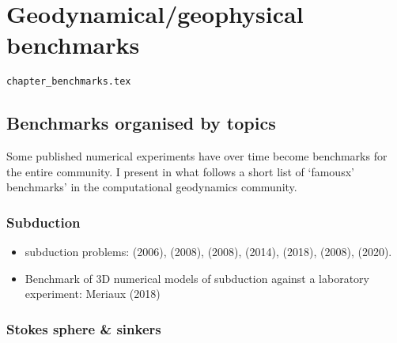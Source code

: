 
\chapter{Geodynamical/geophysical benchmarks \label{sec:geobench}}

\begin{flushright} {\tiny {\color{gray} \tt chapter\_benchmarks.tex}} \end{flushright}

\section{Benchmarks organised by topics}

Some published numerical experiments have over time become benchmarks for the entire
community. I present in what follows a short list of `famousx' benchmarks' in the 
computational geodynamics community.

\subsection{Subduction}

\begin{itemize}
\item subduction problems: \textcite{spka06} (2006), \textcite{scbe08} (2008), 
                           \textcite{vack08} (2008), \textcite{cehg14} (2014),
                           \textcite{gltf18} (2018), \textcite{ozrs08} (2008),
                           \textcite{siwi20} (2020).

\item Benchmark of 3D numerical models of subduction against a laboratory experiment: 
      Meriaux \etal (2018)  \cite{memm18}

\end{itemize}

\subsection{Stokes sphere \& sinkers}

